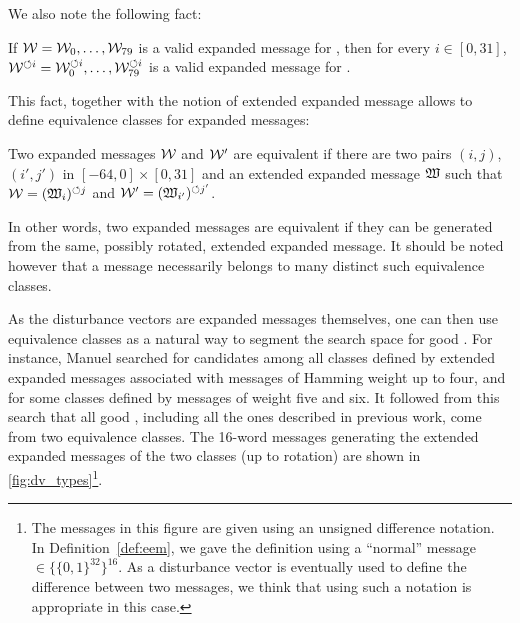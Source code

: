 We also note the following fact:
\begin{fact}
If $\mathcal{W} = \mathcal{W}_0, \ldots, \mathcal{W}_{79}$ is a valid expanded message for \shaone, then for every $i \in [0, 31]$, $\mathcal{W}^{\circlearrowleft i} =
\mathcal{W}_0^{\circlearrowleft i}, \ldots, \mathcal{W}_{79}^{\circlearrowleft i}$ is a valid expanded message for \shaone.
\end{fact}
This fact, together with the notion of extended expanded message allows to define equivalence classes for expanded messages:
\begin{defi}
Two \shaone expanded messages $\mathcal{W}$ and $\mathcal{W}'$ are equivalent if there are two pairs $(i,j)$, $(i',j')$ in $[-64, 0] \times [0, 31]$
and an extended expanded message $\mathfrak{W}$ such that $\mathcal{W} = (\mathfrak{W}_i)^{\circlearrowleft j}$ and $\mathcal{W}' = (\mathfrak{W}_{i'})^{\circlearrowleft j'}$.
\end{defi}
In other words, two expanded messages are equivalent if they can be generated from the same, possibly rotated, extended expanded message. It should be noted
however that a message necessarily belongs to many distinct such equivalence classes.

As the disturbance vectors are expanded messages themselves, one can then use equivalence classes as a natural way to segment the search space for good \dvs. For instance,
Manuel searched for candidates among all classes defined by extended expanded messages associated with messages of Hamming weight up to four, and for some classes defined by
messages of weight five and six. It followed from this search that all good \dvs, including all the ones described in previous work, come from two equivalence classes.
The 16-word messages generating the extended expanded messages of the two classes (up to rotation) are shown in \autoref{fig:dv_types}\footnote{The messages in this
figure are given using an unsigned difference notation. In Definition~\ref{def:eem}, we gave the definition using a ``normal'' message $\in \{\{0,1\}^{32}\}^{16}$. As
a disturbance vector is eventually used to define the difference between two messages, we think that using such a notation is appropriate in this case.}.

